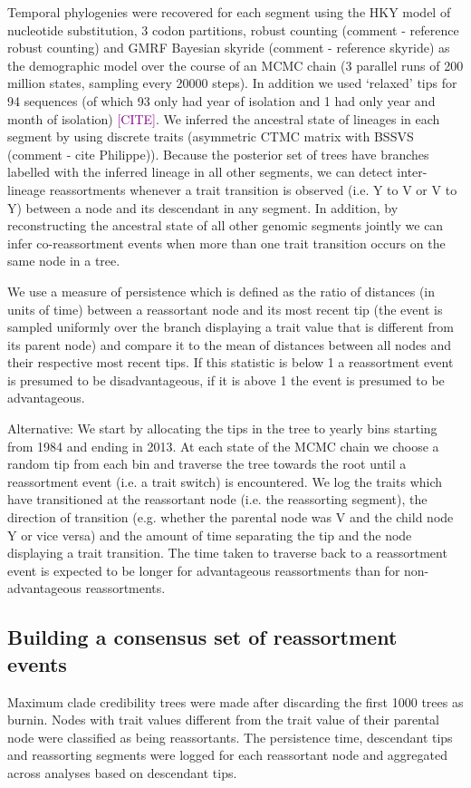 \documentclass[11pt,oneside,letterpaper]{article}
\def\tbc#1{\textcolor{purple}{[#1]}}
\begin{document}
Temporal phylogenies were recovered for each segment using the HKY model of nucleotide substitution, 3 codon partitions, robust counting (comment - reference robust counting) and GMRF Bayesian skyride (comment - reference skyride) as the demographic model over the course of an MCMC chain (3 parallel runs of 200 million states, sampling every 20000 steps).
In addition we used `relaxed' tips for 94 sequences (of which 93 only had year of isolation and 1 had only year and month of isolation) \tbc{CITE}.
We inferred the ancestral state of lineages in each segment by using discrete traits (asymmetric CTMC matrix with BSSVS (comment - cite Philippe)). Because the posterior set of trees have branches labelled with the inferred lineage in all other segments, we can detect inter-lineage reassortments whenever a trait transition is observed (i.e. Y to V or V to Y) between a node and its descendant in any segment. 
In addition, by reconstructing the ancestral state of all other genomic segments jointly we can infer co-reassortment events when more than one trait transition occurs on the same node in a tree.

We use a measure of persistence which is defined as the ratio of distances (in units of time) between a reassortant node and its most recent tip (the event is sampled uniformly over the branch displaying a trait value that is different from its parent node) and compare it to the mean of distances between all nodes and their respective most recent tips. 
If this statistic is below 1 a reassortment event is presumed to be disadvantageous, if it is above 1 the event is presumed to be advantageous.

Alternative:
We start by allocating the tips in the tree to yearly bins starting from 1984 and ending in 2013. 
At each state of the MCMC chain we choose a random tip from each bin and traverse the tree towards the root until a reassortment event (i.e. a trait switch) is encountered.
We log the traits which have transitioned at the reassortant node (i.e. the reassorting segment), the direction of transition (e.g. whether the parental node was V and the child node Y or vice versa) and the amount of time separating the tip and the node displaying a trait transition. 
The time taken to traverse back to a reassortment event is expected to be longer for advantageous reassortments than for non-advantageous reassortments.

\subsection*{Building a consensus set of reassortment events}
Maximum clade credibility trees were made after discarding the first 1000 trees as burnin. 
Nodes with trait values different from the trait value of their parental node were classified as being reassortants.
The persistence time, descendant tips and reassorting segments were logged for each reassortant node and aggregated across analyses based on descendant tips.
\end{document}

